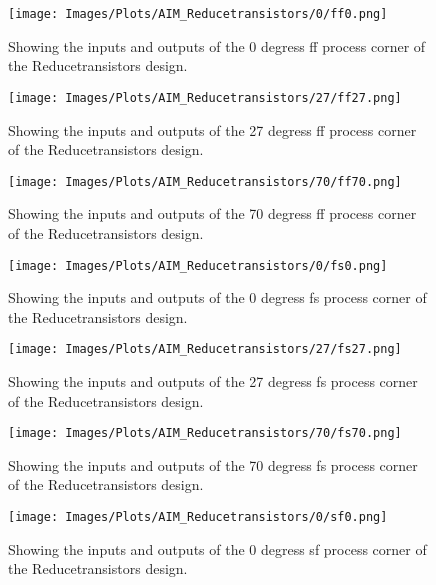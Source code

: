 \begin{figure}[htb] 
    \centering
    \texttt{[image: Images/Plots/AIM\_Reducetransistors/0/ff0.png]} 
    \caption{Showing the inputs and outputs of the 0 degress ff process corner of the Reducetransistors design.} 
    \label{fig:0ffReducetransistors} 
\end{figure}
\newline
\begin{figure}[htb] 
    \centering
    \texttt{[image: Images/Plots/AIM\_Reducetransistors/27/ff27.png]} 
    \caption{Showing the inputs and outputs of the 27 degress ff process corner of the Reducetransistors design.} 
    \label{fig:27ffReducetransistors} 
\end{figure}
\begin{figure}[htb] 
    \centering
    \texttt{[image: Images/Plots/AIM\_Reducetransistors/70/ff70.png]} 
    \caption{Showing the inputs and outputs of the 70 degress ff process corner of the Reducetransistors design.} 
    \label{fig:70ffReducetransistors} 
\end{figure}
\newline
\begin{figure}[htb] 
    \centering
    \texttt{[image: Images/Plots/AIM\_Reducetransistors/0/fs0.png]} 
    \caption{Showing the inputs and outputs of the 0 degress fs process corner of the Reducetransistors design.} 
    \label{fig:0fsReducetransistors} 
\end{figure}
\begin{figure}[htb] 
    \centering
    \texttt{[image: Images/Plots/AIM\_Reducetransistors/27/fs27.png]} 
    \caption{Showing the inputs and outputs of the 27 degress fs process corner of the Reducetransistors design.} 
    \label{fig:27fsReducetransistors} 
\end{figure}
\newline
\begin{figure}[htb] 
    \centering
    \texttt{[image: Images/Plots/AIM\_Reducetransistors/70/fs70.png]} 
    \caption{Showing the inputs and outputs of the 70 degress fs process corner of the Reducetransistors design.} 
    \label{fig:70fsReducetransistors} 
\end{figure}
\begin{figure}[htb] 
    \centering
    \texttt{[image: Images/Plots/AIM\_Reducetransistors/0/sf0.png]} 
    \caption{Showing the inputs and outputs of the 0 degress sf process corner of the Reducetransistors design.} 
    \label{fig:0sfReducetransistors} 
\end{figure}

